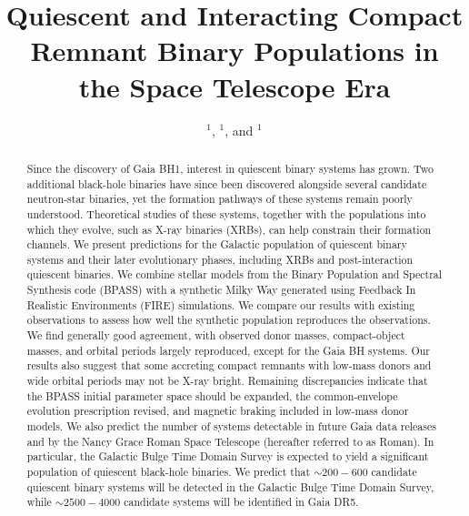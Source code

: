 \documentclass{pas}
\begin{document}



\title{Quiescent and Interacting Compact Remnant Binary Populations in the Space Telescope Era}

\author{ $^{1}$,  $^{1}$, and  $^{1}$}



\citeauth{}


\begin{abstract}
Since the discovery of Gaia BH1, interest in quiescent binary systems has grown. Two additional black-hole binaries have since been discovered alongside several candidate neutron-star binaries, yet the formation pathways of these systems remain poorly understood. Theoretical studies of these systems, together with the populations into which they evolve, such as X-ray binaries (XRBs), can help constrain their formation channels. We present predictions for the Galactic population of quiescent binary systems and their later evolutionary phases, including XRBs and post-interaction quiescent binaries. We combine stellar models from the Binary Population and Spectral Synthesis code (BPASS) with a synthetic Milky Way generated using Feedback In Realistic Environments (FIRE) simulations. We compare our results with existing observations to assess how well the synthetic population reproduces the observations. We find generally good agreement, with observed donor masses, compact-object masses, and orbital periods largely reproduced, except for the Gaia BH systems. Our results also suggest that some accreting compact remnants with low-mass donors and wide orbital periods may not be X-ray bright. Remaining discrepancies indicate that the \textsc{BPASS} initial parameter space should be expanded, the common-envelope evolution prescription revised, and magnetic braking included in low-mass donor models. We also predict the number of systems detectable in future Gaia data releases and by the Nancy Grace Roman Space Telescope (hereafter referred to as Roman). In particular, the Galactic Bulge Time Domain Survey is expected to yield a significant population of quiescent black-hole binaries. We predict that $\sim200-600$ candidate quiescent binary systems will be detected in the Galactic Bulge Time Domain Survey, while $\sim2500-4000$ candidate systems will be identified in Gaia DR5.
\end{abstract}
\end{document}
